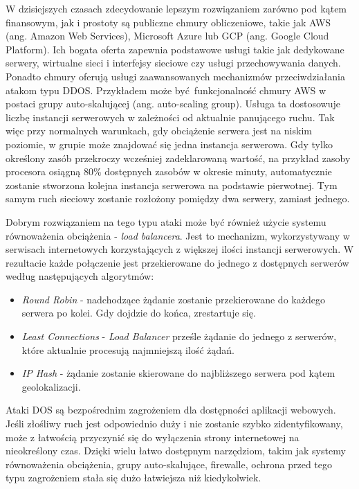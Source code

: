 \documentclass[12pt,twoside]{article}
\begin{document}
W dzisiejszych czasach zdecydowanie lepszym rozwiązaniem zarówno pod kątem finansowym, jak i prostoty są publiczne chmury obliczeniowe, takie jak AWS (ang. Amazon Web Services), Microsoft Azure lub GCP (ang. Google Cloud Platform). Ich bogata oferta zapewnia podstawowe usługi takie jak dedykowane serwery, wirtualne sieci i interfejsy sieciowe czy usługi przechowywania danych. Ponadto chmury oferują usługi zaawansowanych mechanizmów przeciwdziałania atakom typu DDOS. Przykładem może być funkcjonalność chmury AWS w postaci grupy auto-skalującej (ang. auto-scaling group). Usługa ta dostosowuje liczbę instancji serwerowych w zależności od aktualnie panującego ruchu. Tak więc przy normalnych warunkach, gdy obciążenie serwera jest na niskim poziomie, w grupie może znajdować się jedna instancja serwerowa. Gdy tylko określony zasób przekroczy wcześniej zadeklarowaną wartość, na przykład zasoby procesora osiągną 80\% dostępnych zasobów w okresie minuty, automatycznie zostanie stworzona kolejna instancja serwerowa na podstawie pierwotnej. Tym samym ruch sieciowy zostanie rozłożony pomiędzy dwa serwery, zamiast jednego. 

Dobrym rozwiązaniem na tego typu ataki może być również użycie systemu równoważenia obciążenia - \emph{load balancera}. Jest to mechanizm, wykorzystywany w serwisach internetowych korzystających z większej ilości instancji serwerowych. W rezultacie każde połączenie jest przekierowane do jednego z dostępnych serwerów według następujących algorytmów:
\begin{itemize}
	\item \emph{Round Robin} - nadchodzące żądanie zostanie przekierowane do każdego serwera po kolei. Gdy dojdzie do końca, zrestartuje się.
	\item \emph{Least Connections} - \emph{Load Balancer} prześle żądanie do jednego z serwerów, które aktualnie procesują najmniejszą ilość żądań.
	\item \emph{IP Hash} - żądanie zostanie skierowane do najbliższego serwera pod kątem geolokalizacji. 
\end{itemize}

Ataki DOS są bezpośrednim zagrożeniem dla dostępności aplikacji webowych. Jeśli złośliwy ruch jest odpowiednio duży i nie zostanie szybko zidentyfikowany, może z łatwością przyczynić się do wyłączenia strony internetowej na nieokreślony czas. Dzięki wielu łatwo dostępnym narzędziom, takim jak systemy równoważenia obciążenia, grupy auto-skalujące, firewalle, ochrona przed tego typu zagrożeniem stała się dużo łatwiejsza niż kiedykolwiek.
\end{document}
